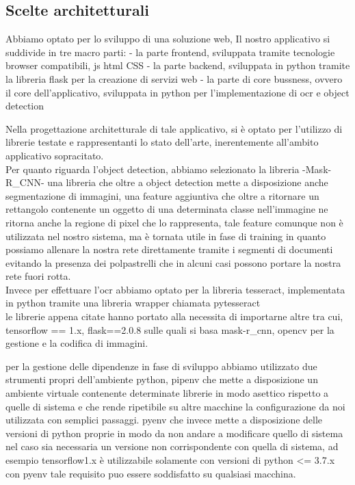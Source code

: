 \documentclass[12pt,a4paper]{article}
\begin{document}
\subsection{Scelte architetturali}

Abbiamo optato per lo sviluppo di una soluzione web, Il nostro applicativo si suddivide in tre macro parti:
- la parte frontend, sviluppata tramite tecnologie browser compatibili, js html CSS
- la parte backend, sviluppata in python tramite la libreria flask per la creazione di servizi web
- la parte di core bussness, ovvero il core dell'applicativo, sviluppata in python per l'implementazione di ocr e object detection

Nella progettazione architetturale di tale applicativo, si è optato per
l'utilizzo di librerie testate e rappresentanti lo stato dell'arte, inerentemente all'ambito applicativo sopracitato.\\
Per quanto riguarda l'object detection, abbiamo selezionato la libreria -Mask-R_CNN-
una libreria che oltre a object detection mette a disposizione anche segmentazione di immagini,
una feature aggiuntiva che oltre a ritornare un rettangolo contenente un oggetto di una determinata classe nell'immagine ne
ritorna anche la regione di pixel che lo rappresenta, tale feature comunque non è utilizzata nel nostro sistema,
ma è tornata utile in fase di training in quanto possiamo allenare la nostra rete direttamente tramite i segmenti di documenti evitando
la presenza dei polpastrelli che in alcuni casi possono portare la nostra rete fuori rotta.\\
Invece per effettuare l'ocr abbiamo optato per la libreria tesseract, implementata in python tramite una libreria wrapper chiamata pytesseract\\

le librerie appena citate hanno portato alla necessita di importarne altre tra cui, tensorflow == 1.x,
flask==2.0.8 sulle quali si basa mask-r_cnn, opencv per la gestione e la codifica di immagini.

per la gestione delle dipendenze in fase di sviluppo abbiamo utilizzato due strumenti propri dell'ambiente 
python, pipenv che mette a disposizione un ambiente virtuale contenente determinate librerie in modo asettico rispetto a quelle di sistema
e che rende ripetibile su altre macchine la configurazione da noi utilizzata con semplici passaggi.
pyenv che invece mette a disposizione delle versioni di python proprie in modo da non andare a modificare quello di sistema nel caso
sia necessaria un versione non corrispondente con quella di sistema, ad esempio tensorflow1.x è utilizzabile
solamente con versioni di python <= 3.7.x con pyenv tale requisito puo essere soddisfatto su qualsiasi macchina.
\end{document}
